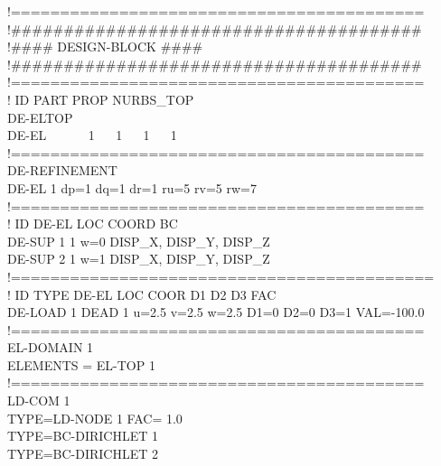 !==========================================\\
!\#\#\#\#\#\#\#\#\#\#\#\#\#\#\#\#\#\#\#\#\#\#\#\#\#\#\#\#\#\#\#\#\#\#\#\#\#\#\#\\
!\#\#\#\# \hspace*{3.4cm} DESIGN-BLOCK \hspace*{3.4cm} \#\#\#\#\\
!\#\#\#\#\#\#\#\#\#\#\#\#\#\#\#\#\#\#\#\#\#\#\#\#\#\#\#\#\#\#\#\#\#\#\#\#\#\#\#\\
!==========================================\\
!     \hspace*{3cm}         ID  PART  PROP   NURBS\_TOP\\
DE-ELTOP\\
\hspace*{0.5cm} DE-EL    ~~~~~~1 ~~ 1 ~~  1    ~~  1\\
!==========================================\\
DE-REFINEMENT\\
\hspace*{0.5cm} DE-EL    1       dp=1    dq=1  dr=1  ru=5   rv=5  rw=7\\
!==========================================\\
!        ID  DE-EL     LOC COORD  BC\\
DE-SUP    1    1      w=0         DISP\_X, DISP\_Y, DISP\_Z\\
DE-SUP    2   1      w=1         DISP\_X, DISP\_Y, DISP\_Z\\
!===========================================\\
!         ID  TYPE    DE-EL   LOC COOR    D1   D2   D3 FAC\\
DE-LOAD   1  DEAD   1   u=2.5  v=2.5  w=2.5 D1=0 D2=0 D3=1 VAL=-100.0\\
!==========================================\\
EL-DOMAIN 1\\
\hspace*{0.5cm} ELEMENTS = EL-TOP 1\\
!==========================================\\
LD-COM 1\\
\hspace*{0.5cm} TYPE=LD-NODE 1 FAC= 1.0\\
\hspace*{0.5cm} TYPE=BC-DIRICHLET 1\\
\hspace*{0.5cm} TYPE=BC-DIRICHLET 2\\